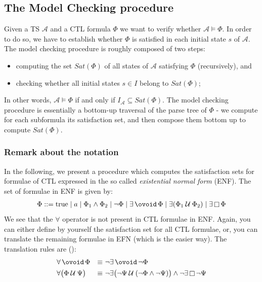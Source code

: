 \documentclass{article}
\begin{document}
\subsection{The Model Checking procedure}
\label{subsec:mc}
Given a TS $\mathcal{A}$ and a CTL formula $\Phi$ we want to verify whether $\mathcal{A} \vDash \Phi$.
In order to do so, we have to establish whether $\Phi$ is satisfied in each initial state $s$ of $\mathcal{A}$.
The model checking procedure is roughly composed of two steps: 
\begin{itemize}
    \item computing the set $Sat(\Phi)$ of all states of $\mathcal{A}$ satisfying $\Phi$ (recursively), and
    \item checking whether all initial states $s \in I$ belong to $Sat(\Phi)$; 
\end{itemize}
In other words, $\mathcal{A} \vDash \Phi$ if and only if $I_{\mathcal{A}} \subseteq Sat(\Phi)$.
The model checking procedure is essentially a bottom-up traversal of the parse tree of $\Phi$ - we compute
for each subformula its satisfaction set, and then compose them bottom up to compute $Sat(\Phi)$.

\subsubsection{Remark about the notation}
In the following, we present a procedure which computes the satisfaction sets for formulae of 
CTL expressed in the so called \emph{existential normal form} (ENF). The set of formulae in ENF is given by: 
\begin{align*}
    & \Phi ::= \text{true} \mid a \mid \Phi_1 \land \Phi_2 \mid \neg \Phi \mid \exists \lnext{\Phi} \mid \exists (\lluntil{\Phi_1}{\Phi_2}) \mid \exists \llglob \Phi \\
\end{align*}
We see that the $\forall$ operator is not present in CTL formulae in ENF.
Again, you can either define by yourself the satisfaction set for all CTL formulae, 
or, you can translate the remaining formulae in EFN (which is the easier way).
The translation rules are (\cite[Paragraph 6.2.4]{BaKa}):
\begin{alignat*}{2}
    & \forall \lnext{\Phi} & \equiv \,\, & \neg \exists \lnext{\neg \Phi} \\
    & \forall \big( \lluntil{\Phi}{\Psi} \big) \, & \equiv \, \, & \neg \exists \big( \lluntil{\neg \Psi}{(\neg \Phi \land \neg \Psi)} \big) \land \neg \exists \llglob \neg \Psi \\
\end{alignat*}
\end{document}
